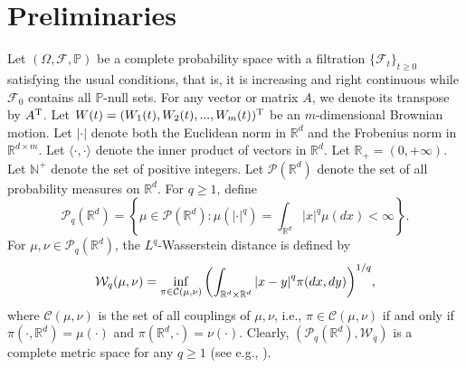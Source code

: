 \documentclass[preprint,12pt,compress]{elsarticle}
\begin{document}
\section{Preliminaries} \label{sec2}
Let $(\Omega ,\mathcal{F},\mathbb{P})$ be a complete probability space with a filtration ${\{ {\mathcal{F}_t}\} _{t \ge 0}}$ satisfying the usual conditions, that is, it is increasing and right continuous while $\mathcal{F}_0$ contains all $\mathbb{P}$-null sets. For any vector or matrix $A$, we denote its transpose by $A^{\rm T}$. Let $W(t) = (W_1(t), W_2(t),...,W_m(t))^{\rm T} $ be an $m$-dimensional Brownian motion. Let $\left|  \cdot  \right|$ denote both the Euclidean norm in $\mathbb{R}^d$ and the Frobenius norm in $\mathbb{R}^{d \times m}$. Let $\langle { \cdot,  \cdot } \rangle $ denote the inner product of vectors in $\mathbb{R}^d$.  
Let $\mathbb{R}_+ = (0, +\infty)$. Let $\mathbb{N}^+$ denote the set of positive integers.
Let $\mathcal{P}(\mathbb{R}^d)$ denote the set of all probability measures on $\mathbb{R}^d$. For $q \ge 1$, define
\begin{equation*}
	{\mathcal{P}_q}({\mathbb{R}^d}) = \left\{ {\mu  \in \mathcal{P}({\mathbb{R}^d}):\mu \left( {{{\left|  \cdot  \right|}^q}} \right) = \int_{{\mathbb{R}^d}} {{{\left| x \right|}^q}\mu (dx)}  < \infty } \right\} .
\end{equation*}
For $\mu ,\nu  \in {\mathcal{P}_q}({\mathbb{R}^d})$, the $L^q$-Wasserstein distance is defined by
\begin{equation*}
	{{\cal W}_q}(\mu ,\nu ) = \mathop {\inf }\limits_{\pi  \in {\cal C}(\mu ,\nu )} {\left( {\int_{{\mathbb{R}^d} \times {\mathbb{R}^d}} {{{\left| {x - y} \right|}^q}\pi (dx,dy)} } \right)^{1/q}} ,
\end{equation*}
where $\mathcal{C}(\mu ,\nu )$ is the set of all couplings of $\mu ,\nu$, i.e., $\pi  \in \mathcal{C}(\mu ,\nu )$ if and only if $\pi ( \cdot ,{\mathbb{R}^d}) = \mu ( \cdot )$ and $\pi ({\mathbb{R}^d}, \cdot) = \nu ( \cdot )$. Clearly, $({\mathcal{P}_q}({\mathbb{R}^d}),{\mathcal{W}_q})$ is a complete metric space for any $q \ge 1$ (see e.g., \cite[Theorem 5.4, p. 175]{chen2004from}).
\end{document}
